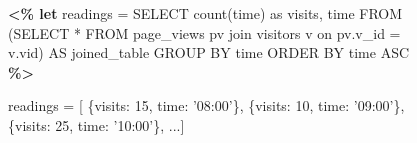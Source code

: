  \begin{figure}[hbt!]
 \centering
 \begin{minipage}[c]{6cm}
 \begin{minipage}[c]{6.5cm}
 \begin{code}
 \textbf{<\% let} readings = 
    SELECT count(time) as visits, time
    FROM (SELECT * FROM page_views pv 
   	     join visitors v 
          on pv.v_id = v.vid) AS joined_table
    GROUP BY time 
    ORDER BY time ASC \textbf{\%>}
 \end{code}
 \vspace*{-0.4cm}
 \label{figure:first-running-example:data-retrieval}
 \vspace*{0.3cm}
 \end{minipage}
 
 
 
 \begin{minipage}[c]{6.5cm}
 \begin{code}
 readings = [
    \{visits: 15, time: '08:00'\}, 
    \{visits: 10, time: '09:00'\},
    \{visits: 25, time: '10:00'\},  ...]
 \end{code}
 \vspace*{-0.4cm}
 \label{figure:running-example:query-result}
 \vspace*{0.3cm}
 \end{minipage}
 

\end{minipage}
\end{figure}
